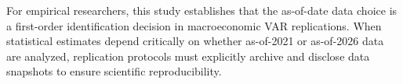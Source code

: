 For empirical researchers, this study establishes that the as-of-date data choice is a first-order identification decision in macroeconomic VAR replications. When statistical estimates depend critically on whether as-of-2021 or as-of-2026 data are analyzed, replication protocols must explicitly archive and disclose data snapshots to ensure scientific reproducibility.
